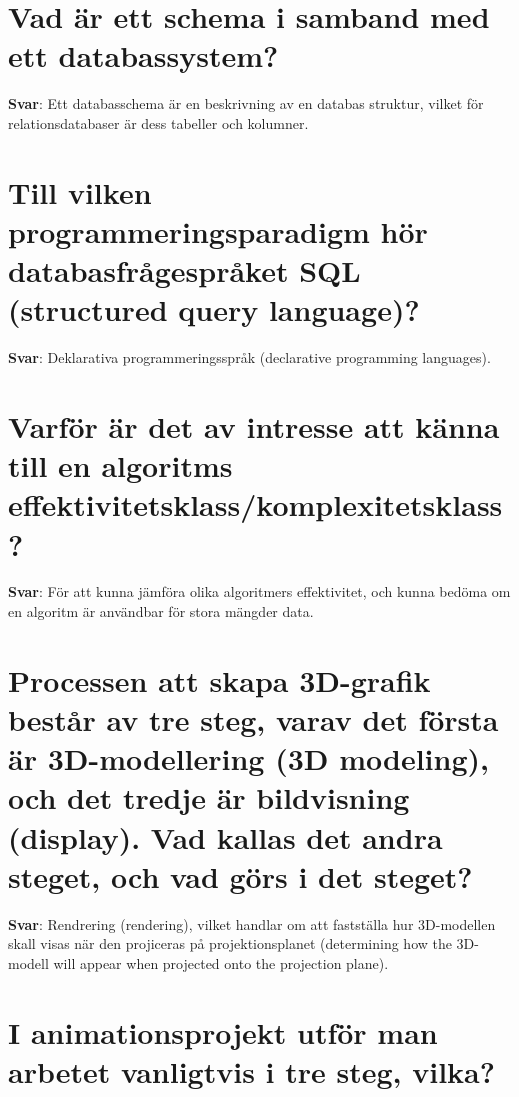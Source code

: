 \documentclass[a4paper,11pt,oneside]{book}
\begin{document}
\begin{sloppypar}
\section{Vad \"ar ett schema i samband med ett databassystem?}

\label{q:298:sa:sv:True}

\textbf{Svar}: Ett databasschema \"ar en beskrivning av en databas struktur, vilket f\"or relationsdatabaser \"ar dess tabeller och kolumner.



\section{Till vilken programmeringsparadigm h\"or databasfr\r{a}gespr\r{a}ket SQL (structured query language)?}

\label{q:299:sa:sv:True}

\textbf{Svar}: Deklarativa programmeringsspr\r{a}k (declarative programming languages).



\section{Varf\"or \"ar det av intresse att k\"anna till en algoritms effektivitetsklass/komplexitetsklass?}

\label{q:300:sa:sv:True}

\textbf{Svar}: F\"or att kunna j\"amf\"ora olika algoritmers effektivitet, och kunna bed\"oma om en algoritm \"ar anv\"andbar f\"or stora m\"angder data.



\section{Processen att skapa 3D-grafik best\r{a}r av tre steg, varav det f\"orsta \"ar 3D-modellering (3D modeling), och det tredje \"ar bildvisning (display). Vad kallas det andra steget, och vad g\"ors i det steget?}

\label{q:301:sa:sv:True}

\textbf{Svar}: Rendrering (rendering), vilket handlar om att fastst\"alla hur 3D-modellen skall visas n\"ar den projiceras p\r{a} projektionsplanet (determining how the 3D-modell will appear when projected onto the projection plane).



\section{I animationsprojekt utf\"or man arbetet vanligtvis i tre steg, vilka?}


\end{sloppypar}
\end{document}
